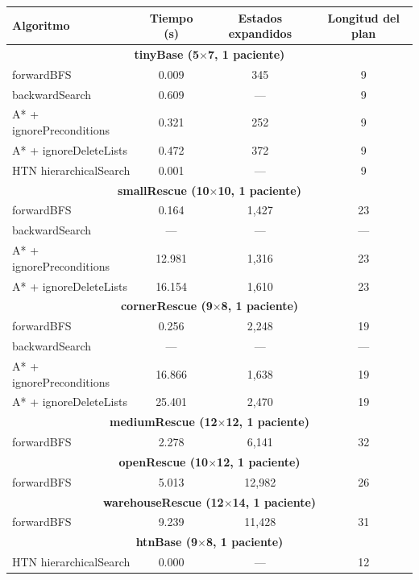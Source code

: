 \begin{table}[H]
\begin{center}
\label{tab:comparativa}
\renewcommand{\arraystretch}{1.4}
\begin{tabular}{|l|c|c|c|}
\hline
\textbf{Algoritmo} & \textbf{Tiempo (s)} & \textbf{Estados expandidos} & \textbf{Longitud del plan} \\
\hline
\multicolumn{4}{|c|}{\textbf{tinyBase (5$\times$7, 1 paciente)}} \\
\hline
forwardBFS & 0.009 & 345 & 9 \\
backwardSearch & 0.609 & --- & 9 \\
A* + ignorePreconditions & 0.321 & 252 & 9 \\
A* + ignoreDeleteLists & 0.472 & 372 & 9 \\
HTN hierarchicalSearch & 0.001 & --- & 9 \\
\hline
\multicolumn{4}{|c|}{\textbf{smallRescue (10$\times$10, 1 paciente)}} \\
\hline
forwardBFS & 0.164 & 1,427 & 23 \\
backwardSearch & --- & --- & --- \\
A* + ignorePreconditions & 12.981 & 1,316 & 23 \\
A* + ignoreDeleteLists & 16.154 & 1,610 & 23 \\
\hline
\multicolumn{4}{|c|}{\textbf{cornerRescue (9$\times$8, 1 paciente)}} \\
\hline
forwardBFS & 0.256 & 2,248 & 19 \\
backwardSearch & --- & --- & --- \\
A* + ignorePreconditions & 16.866 & 1,638 & 19 \\
A* + ignoreDeleteLists & 25.401 & 2,470 & 19 \\
\hline
\multicolumn{4}{|c|}{\textbf{mediumRescue (12$\times$12, 1 paciente)}} \\
\hline
forwardBFS & 2.278 & 6,141 & 32 \\
\hline
\multicolumn{4}{|c|}{\textbf{openRescue (10$\times$12, 1 paciente)}} \\
\hline
forwardBFS & 5.013 & 12,982 & 26 \\
\hline
\multicolumn{4}{|c|}{\textbf{warehouseRescue (12$\times$14, 1 paciente)}} \\
\hline
forwardBFS & 9.239 & 11,428 & 31 \\
\hline
\multicolumn{4}{|c|}{\textbf{htnBase (9$\times$8, 1 paciente)}} \\
\hline
HTN hierarchicalSearch & 0.000 & --- & 12 \\

\end{tabular}
\end{center}
\end{table}
